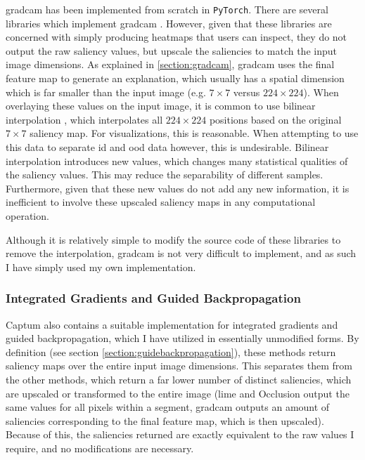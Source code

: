 \documentclass[UKenglish]{uiomasterthesis} %
\theoremstyle{definition}
\begin{document}
\ac{gradcam} has been implemented from scratch in \texttt{PyTorch}. There are several libraries which implement \ac{gradcam} \cite{jacobgilpytorchcam, captum}. However, given that these libraries are concerned with simply producing heatmaps that users can inspect, they do not output the raw saliency values, but upscale the saliencies to match the input image dimensions. As explained in \ref{section:gradcam}, \ac{gradcam} uses the final feature map to generate an explanation, which usually has a spatial dimension which is far smaller than the input image (e.g. $7 \times 7$ versus $224 \times 224$). When overlaying these values on the input image, it is common to use bilinear interpolation \cite{jacobgilpytorchcam}, which interpolates all $224 \times 224$ positions based on the original $7 \times 7$ saliency map. For visualizations, this is reasonable. When attempting to use this data to separate \ac{id} and \ac{ood} data however, this is undesirable. Bilinear interpolation introduces new values, which changes many statistical qualities of the saliency values. This may reduce the separability of different samples. Furthermore, given that these new values do not add any new information, it is inefficient to involve these upscaled saliency maps in any computational operation.

Although it is relatively simple to modify the source code of these libraries to remove the interpolation, \ac{gradcam} is not very difficult to implement, and as such I have simply used my own implementation.

\subsubsection{Integrated Gradients and Guided Backpropagation}

Captum also contains a suitable implementation for integrated gradients and guided backpropagation, which I have utilized in essentially unmodified forms. By definition (see section \ref{section:guidebackpropagation}), these methods return saliency maps over the entire input image dimensions. This separates them from the other methods, which return a far lower number of distinct saliencies, which are upscaled or transformed to the entire image (\ac{lime} and Occlusion output the same values for all pixels within a segment, \ac{gradcam} outputs an amount of saliencies corresponding to the final feature map, which is then upscaled). Because of this, the saliencies returned are exactly equivalent to the raw values I require, and no modifications are necessary.
\end{document}
